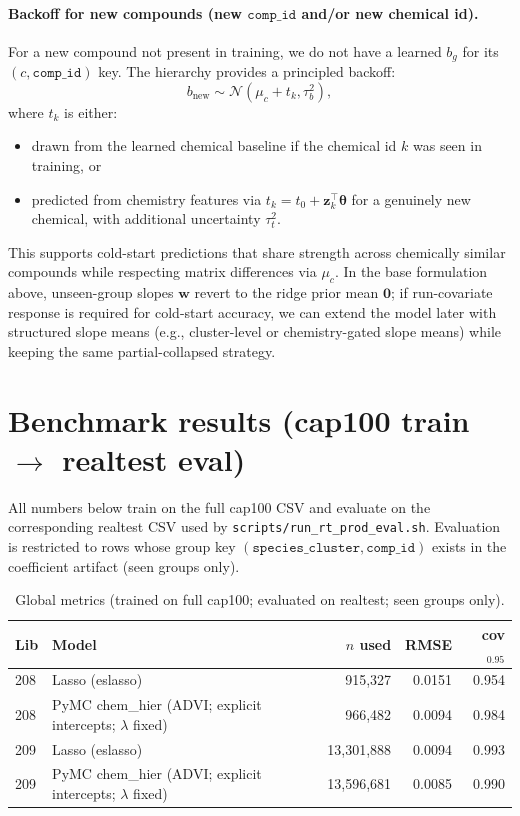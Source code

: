 \documentclass[11pt]{article}
\begin{document}
\paragraph{Backoff for new compounds (new $\texttt{comp\_id}$ and/or new chemical id).}
For a new compound not present in training, we do not have a learned $b_g$ for its $(c, \texttt{comp\_id})$ key. The hierarchy provides
a principled backoff:
\[
  b_{\text{new}} \sim \mathcal{N}\!\left(\mu_c + t_k, \tau_b^2\right),
\]
where $t_k$ is either:
\begin{itemize}
  \item drawn from the learned chemical baseline if the chemical id $k$ was seen in training, or
  \item predicted from chemistry features via $t_k = t_0 + \bm{z}_k^\top \bm{\theta}$ for a genuinely new chemical, with additional
        uncertainty $\tau_t^2$.
\end{itemize}
This supports cold-start predictions that share strength across chemically similar compounds while respecting matrix differences via $\mu_c$.
In the base formulation above, unseen-group slopes $\bm{w}$ revert to the ridge prior mean $\bm{0}$; if run-covariate response is required
for cold-start accuracy, we can extend the model later with structured slope means (e.g., cluster-level or chemistry-gated slope means)
while keeping the same partial-collapsed strategy.

\section{Benchmark results (cap100 train $\rightarrow$ realtest eval)}

All numbers below train on the full cap100 CSV and evaluate on the corresponding realtest CSV used by
\texttt{scripts/run\_rt\_prod\_eval.sh}. Evaluation is restricted to rows whose group key
$(\texttt{species\_cluster}, \texttt{comp\_id})$ exists in the coefficient artifact (seen groups only).

\begin{table}[H]
\centering
\begin{tabular}{llrrr}
\toprule
Lib & Model & $n$ used & RMSE & cov$_{0.95}$ \\
\midrule
208 & Lasso (eslasso) & 915{,}327 & 0.0151 & 0.954 \\
208 & PyMC chem\_hier (ADVI; explicit intercepts; $\lambda$ fixed) & 966{,}482 & 0.0094 & 0.984 \\
\midrule
209 & Lasso (eslasso) & 13{,}301{,}888 & 0.0094 & 0.993 \\
209 & PyMC chem\_hier (ADVI; explicit intercepts; $\lambda$ fixed) & 13{,}596{,}681 & 0.0085 & 0.990 \\
\bottomrule
\end{tabular}
\caption{Global metrics (trained on full cap100; evaluated on realtest; seen groups only).}
\end{table}
\end{document}
